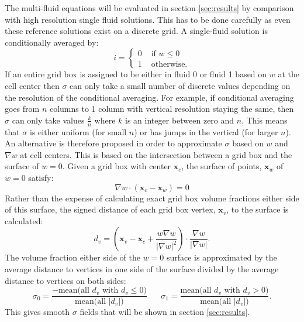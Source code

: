 \documentclass[draft]{agujournal2019}
\begin{document}
The multi-fluid equations will be evaluated in section \ref{sec:results} by comparison with high resolution single fluid solutions. This has to be done carefully as even these reference solutions exist on a discrete grid. A single-fluid solution is conditionally averaged by:
\begin{equation}
i =
\begin{cases}
    0 & \text{ if }w\le 0 \\
    1 & \text{ otherwise.}
\end{cases}
\end{equation}
If an entire grid box is assigned to be either in fluid 0 or fluid 1 based on $w$ at the cell center then $\sigma$ can only take a small number of discrete values depending on the resolution of the conditional averaging. For example, if conditional averaging goes from $n$ columns to 1 column with vertical resolution staying the same, then $\sigma$ can only take values $\frac{k}{n}$ where $k$ is an integer between zero and $n$. This means that $\sigma$ is either uniform (for small $n$) or has jumps in the vertical (for larger $n$). An alternative is therefore proposed in order to approximate $\sigma$ based on $w$ and $\nabla w$ at cell centers. This is based on the intersection between a grid box and the surface of $w=0$. Given a grid box with center $\mathbf{x}_c$, the surface of points, $\mathbf{x}_w$ of $w=0$ satisfy:
\begin{equation}
\nabla w \cdot \left(\mathbf{x}_c - \mathbf{x}_w\right) = 0
\end{equation}
Rather than the expense of calculating exact grid box volume fractions either side of this surface, the signed distance of each grid box vertex, $\mathbf{x}_v$, to the surface is calculated:
\begin{equation}
d_v = \left(
     \mathbf{x}_v - \mathbf{x}_c + \frac{w \nabla w}{|\nabla w|^2} 
\right) \cdot \frac{\nabla w}{|\nabla w|}.
\end{equation}
The volume fraction either side of the $w=0$ surface is approximated by the average distance to vertices in one side of the surface divided by the average distance to vertices on both sides:
\begin{equation}
\sigma_0 = 
\frac{-\text{mean}\bigl(\text{all } d_v \text{ with } d_v \le 0\bigr)}
{\text{mean}\bigl(\text{all } |d_v| \bigl)}
\;\;\;\;\;\;
\sigma_1 = 
\frac{\text{mean}\bigl(\text{all } d_v \text{ with } d_v > 0\bigr)}
{\text{mean}\bigl(\text{all } |d_v| \bigl)}.
\end{equation}
This gives smooth $\sigma$ fields that will be shown in section \ref{sec:results}.
\end{document}
